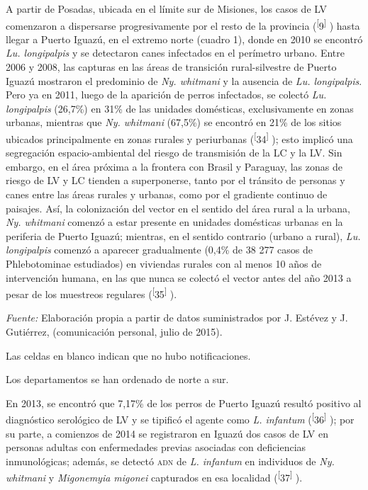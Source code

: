 \documentclass{article}
\begin{document}
A partir de Posadas, ubicada en el límite sur de Misiones, los casos de LV
comenzaron a dispersarse progresivamente por el resto de la provincia
(\textsuperscript{[}9\textsuperscript{]}
) hasta llegar a Puerto Iguazú, en el extremo norte (cuadro 1), donde en 2010 se
encontró \textit{Lu. longipalpis}
y se detectaron canes infectados en el perímetro urbano. Entre 2006 y 2008, las
capturas en las áreas de transición rural-silvestre de Puerto Iguazú mostraron
el predominio de \textit{Ny. whitmani}
y la ausencia de \textit{Lu. longipalpis}. Pero ya en 2011, luego de la aparición de perros infectados, se colectó
\textit{Lu. longipalpis}
(26,7\%) en 31\% de las unidades domésticas, exclusivamente en zonas urbanas,
mientras que \textit{Ny. whitmani}
(67,5\%) se encontró en 21\% de los sitios ubicados principalmente en zonas
rurales y periurbanas (\textsuperscript{[}34\textsuperscript{]}
); esto implicó una segregación espacio-ambiental del riesgo de transmisión de
la LC y la LV. Sin embargo, en el área próxima a la frontera con Brasil y
Paraguay, las zonas de riesgo de LV y LC tienden a superponerse, tanto por el
tránsito de personas y canes entre las áreas rurales y urbanas, como por el
gradiente continuo de paisajes. Así, la colonización del vector en el sentido
del área rural a la urbana, \textit{Ny. whitmani}
comenzó a estar presente en unidades domésticas urbanas en la periferia de
Puerto Iguazú; mientras, en el sentido contrario (urbano a rural), \textit{Lu.
longipalpis}
comenzó a aparecer gradualmente (0,4\% de 38 277 casos de Phlebotominae
estudiados) en viviendas rurales con al menos 10 años de intervención humana, en
las que nunca se colectó el vector antes del año 2013 a pesar de los muestreos
regulares (\textsuperscript{[}35\textsuperscript{]}
).

\textit{Fuente:}
Elaboración propia a partir de datos suministrados por J. Estévez y J.
Gutiérrez, (comunicación personal, julio de 2015).

Las celdas en blanco indican que no hubo notificaciones.

Los departamentos se han ordenado de norte a sur.

En 2013, se encontró que 7,17\% de los perros de Puerto Iguazú resultó positivo
al diagnóstico serológico de LV y se tipificó el agente como \textit{L.
infantum}
(\textsuperscript{[}36\textsuperscript{]}
); por su parte, a comienzos de 2014 se registraron en Iguazú dos casos de LV en
personas adultas con enfermedades previas asociadas con deficiencias
inmunológicas; además, se detectó \textsc{adn} de \textit{L. infantum}
en individuos de \textit{Ny. whitmani}
y \textit{Migonemyia migonei}
capturados en esa localidad (\textsuperscript{[}37\textsuperscript{]}
).
\end{document}
